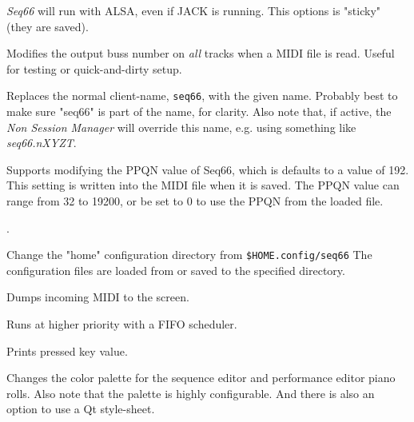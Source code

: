 

      \textsl{Seq66} will run with ALSA, even if JACK is running.
      This options is "sticky" (they are saved).

      Modifies the output buss number on \textsl{all} tracks when a MIDI file is
      read.  Useful for testing or quick-and-dirty setup.

      Replaces the normal client-name, \texttt{seq66}, with the given name.
      Probably best to make sure "seq66" is part of the name, for clarity.
      Also note that, if active, the \textsl{Non Session Manager} will override
      this name, e.g. using something like \textsl{seq66.nXYZT}.

      Supports modifying the PPQN value of Seq66, which is
      defaults to a value of 192.  This setting
      is written into the MIDI file when it is saved.
      The PPQN value can range from 32 to 19200, or
      be set to 0 to use the PPQN from the loaded file.

      .


      Change the "home" configuration directory from \texttt{\$HOME.config/seq66}
      The configuration files are loaded from or saved to the specified directory.

      Dumps incoming MIDI to the screen.

      Runs at higher priority with a FIFO scheduler.


      Prints pressed key value.

      Changes the color palette for the sequence editor and performance editor
      piano rolls.  Also note that the palette is highly configurable.
      And there is also an option to use a Qt style-sheet.


